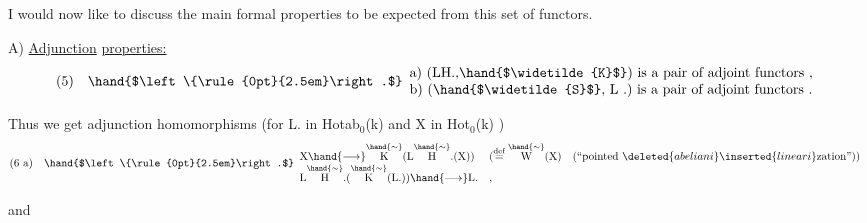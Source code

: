 I would now like to discuss the main formal properties to be expected
from this set of functors.

A) \uline{Adjunction} \uline{properties:}
\[
(5)\quad \hand{$\left\{\rule{0pt}{2.5em}\right.$}
\begin{array}{l}
\text{a) (LH.,}\hand{$\widetilde{K}$}\text{) is a pair of adjoint functors ,}\\
\text{b) (}\hand{$\widetilde{S}$}\text{, L\ .) is a pair of adjoint functors .}
\end{array}
\]

Thus we get adjunction homomorphisms (for L. in Hotab$_0$(k) and X
in Hot$_0$(k) )
\[
(6\ \text{a})\quad \hand{$\left\{\rule{0pt}{2.5em}\right.$}
\begin{array}{ll}
\text{X} \hand{\longrightarrow} \overset{\hand{\sim}}{\text{K}}(\text{L}\overset{\hand{\sim}}{\text{H}}.(\text{X})) & (\overset{\text{def}}{=} \overset{\hand{\sim}}{\text{W}}(\text{X}) \quad (\text{``pointed }\deleted{abeliani}\inserted{lineari}\text{zation''}))\\
\text{L}\overset{\hand{\sim}}{\text{H}}.(\overset{\hand{\sim}}{\text{K}}(\text{L.})) \hand{\longrightarrow} \text{L.} & ,
\end{array}
\]

and



